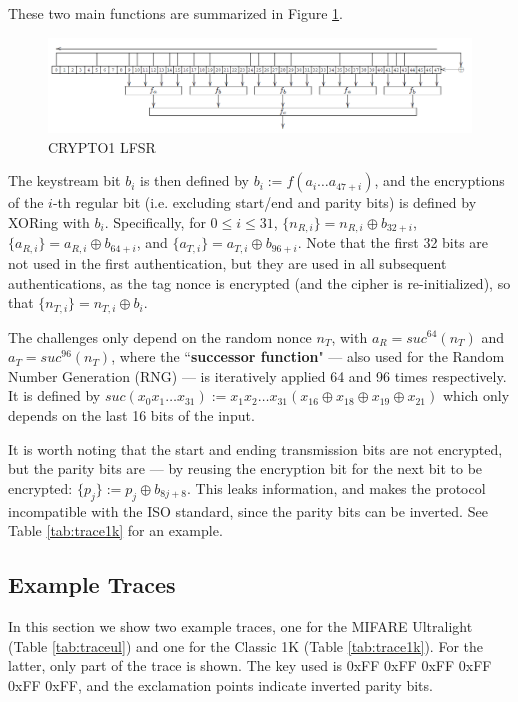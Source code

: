 \documentclass[fleqn,10pt]{SelfArx} %
\begin{document}
These two main functions are summarized in Figure \ref{fig:lfsr}.

\begin{figure}[h]
  \hfill\includegraphics[width=\linewidth]{img/lfsr} \hspace*{\fill}
  \caption{CRYPTO1 LFSR \cite{classicvulnerabilities}}
  \label{fig:lfsr}
\end{figure}

The keystream bit $b_i$ is then defined by $b_i := f(a_i\ldots a_{47+i})$, and the encryptions of the $i$-th regular bit (i.e. excluding start/end and parity bits) is defined by XORing with $b_i$. Specifically, for $0\le i \le 31$, $\{n_{R,i}\}=n_{R,i} \oplus b_{32+i}$, $\{a_{R,i}\}=a_{R,i} \oplus b_{64+i}$, and $\{a_{T,i}\}=a_{T,i} \oplus b_{96+i}$. Note that the first 32 bits are not used in the first authentication, but they are used in all subsequent authentications, as the tag nonce is encrypted (and the cipher is re-initialized), so that $\{n_{T,i}\}=n_{T,i} \oplus b_i$. 

The challenges only depend on the random nonce $n_T$, with $a_R=suc^{64}(n_T)$ and $a_T=suc^{96}(n_T)$, where the ``{\bf successor function}" --- also used for the Random Number Generation (RNG) --- is iteratively applied 64 and 96 times respectively. It is defined by $suc(x_0x_1\ldots x_{31}):=x_1x_2\ldots x_{31}(x_{16}\oplus x_{18}\oplus x_{19}\oplus x_{21})$ which only depends on the last 16 bits of the input.


It is worth noting that the start and ending transmission bits are not encrypted, but the parity bits are --- by reusing the encryption bit for the next bit to be encrypted: $\{p_j\} :=p_j \oplus b_{8j +8}$. This leaks information, and makes the protocol incompatible with the ISO standard, since the parity bits can be inverted. See Table \ref{tab:trace1k} for an example.


\subsection{Example Traces}
\label{app:traces}

In this section we show two example traces, one for the MIFARE Ultralight (Table \ref{tab:traceul}) and one for the Classic 1K (Table \ref{tab:trace1k}). For the latter, only part of the trace is shown. The key used is 0xFF 0xFF 0xFF 0xFF 0xFF 0xFF, and the exclamation points indicate inverted parity bits.
\end{document}
